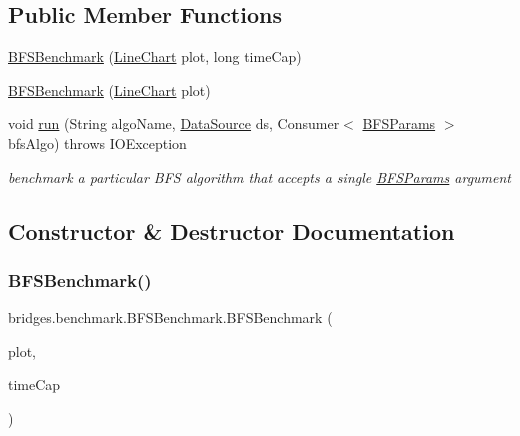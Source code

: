 \subsection*{Public Member Functions}
\begin{DoxyCompactItemize}
\item 
\hyperlink{classbridges_1_1benchmark_1_1_b_f_s_benchmark_a47647a605d5cd6523e1472191e12ab94}{B\+F\+S\+Benchmark} (\hyperlink{classbridges_1_1base_1_1_line_chart}{Line\+Chart} plot, long time\+Cap)
\item 
\hyperlink{classbridges_1_1benchmark_1_1_b_f_s_benchmark_afe4a4dd46295e41c1cb7ee25c616a2c9}{B\+F\+S\+Benchmark} (\hyperlink{classbridges_1_1base_1_1_line_chart}{Line\+Chart} plot)
\item 
void \hyperlink{classbridges_1_1benchmark_1_1_b_f_s_benchmark_a4f8065c05f80164bc981c038a35996eb}{run} (String algo\+Name, \hyperlink{classbridges_1_1connect_1_1_data_source}{Data\+Source} ds, Consumer$<$ \hyperlink{classbridges_1_1benchmark_1_1_b_f_s_params}{B\+F\+S\+Params} $>$ bfs\+Algo)  throws I\+O\+Exception 
\begin{DoxyCompactList}\small\item\em benchmark a particular B\+FS algorithm that accepts a single \hyperlink{classbridges_1_1benchmark_1_1_b_f_s_params}{B\+F\+S\+Params} argument \end{DoxyCompactList}\end{DoxyCompactItemize}


\subsection{Constructor \& Destructor Documentation}
\mbox{\label{classbridges_1_1benchmark_1_1_b_f_s_benchmark_a47647a605d5cd6523e1472191e12ab94}} 
\subsubsection{\texorpdfstring{B\+F\+S\+Benchmark()}{BFSBenchmark()}\hspace{0.1cm}{\footnotesize\ttfamily [1/2]}}
{\footnotesize\ttfamily bridges.\+benchmark.\+B\+F\+S\+Benchmark.\+B\+F\+S\+Benchmark (\begin{DoxyParamCaption}\item[{\hyperlink{classbridges_1_1base_1_1_line_chart}{Line\+Chart}}]{plot,  }\item[{long}]{time\+Cap }\end{DoxyParamCaption})}

